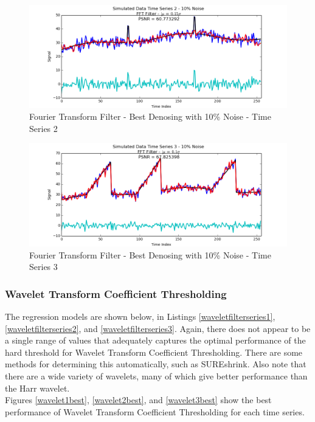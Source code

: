 \documentclass[11pt]{article}
\theoremstyle{definition}
\begin{document}
\begin{figure}
\centering
\includegraphics[width = 0.75 \textwidth]{FFTSignal2Best.png}
\caption{Fourier Transform Filter - Best Denosing with 10\% Noise - Time Series 2}
\label{fft2best}
\end{figure}

\begin{figure}
\centering
\includegraphics[width = 0.75 \textwidth]{FFTSignal3Best.png}
\caption{Fourier Transform Filter - Best Denosing with 10\% Noise - Time Series 3}
\label{fft3best}
\end{figure}

\newpage

\subsubsection{Wavelet Transform Coefficient Thresholding}

The regression models are shown below, in Listings \ref{waveletfilterseries1}, \ref{waveletfilterseries2}, and \ref{waveletfilterseries3}. Again, there does not appear to be a single range of values that adequately captures the optimal performance of the hard threshold for Wavelet Transform Coefficient Thresholding. There are some methods for determining this automatically, such as SUREshrink. Also note that there are a wide variety of wavelets, many of which give better performance than the Harr wavelet.\\

Figures \ref{wavelet1best}, \ref{wavelet2best}, and \ref{wavelet3best} show the best performance of Wavelet Transform Coefficient Thresholding for each time series.
\end{document}
